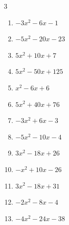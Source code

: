\begin{multicols}{3}
\begin{enumerate}
  \item $-3x^{2}-6x-1$


  \item $-5x^{2}-20x-23$


  \item $5x^{2}+10x+7$


  \item $5x^{2}-50x+125$


  \item $x^{2}-6x+6$


\columnbreak %

\resetques

  \item $5x^{2}+40x+76$


  \item $-3x^{2}+6x-3$


  \item $-5x^{2}-10x-4$


  \item $3x^{2}-18x+26$


  \item $-x^{2}+10x-26$


  \item $3x^{2}-18x+31$


  \item $-2x^{2}-8x-4$


  \item $-4x^{2}-24x-38$



\end{enumerate}
\end{multicols}
